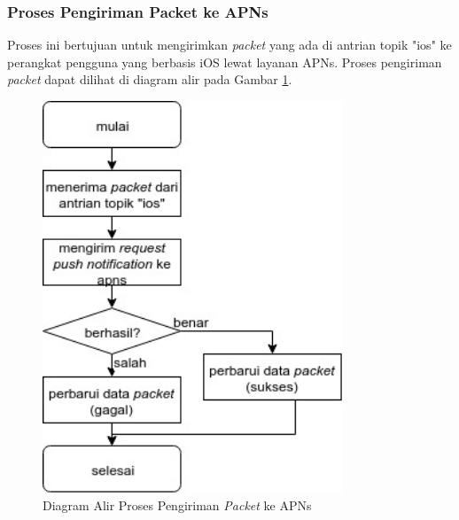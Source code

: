 \subsubsection{Proses Pengiriman Packet ke APNs}
\par Proses ini bertujuan untuk mengirimkan \textit{packet} yang ada di antrian topik "ios" ke perangkat pengguna yang berbasis iOS lewat layanan APNs. Proses pengiriman \textit{packet} dapat dilihat di diagram alir pada
Gambar \ref{flowchart_pengiriman_packet_ke_apns}.
\begin{figure}[H]
	\centering\includegraphics[width=0.8\textwidth]{bab3/img/flowchart-pengiriman_packet_ke_apns.jpg}
	\caption{Diagram Alir Proses Pengiriman \textit{Packet} ke APNs} \label{flowchart_pengiriman_packet_ke_apns}
\end{figure}

\clearpage

